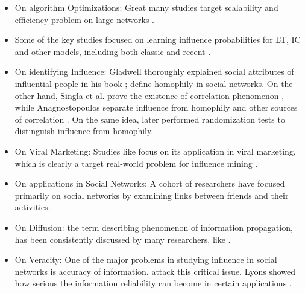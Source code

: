 	\begin{itemize}
		\item On algorithm Optimizations: Great many studies target scalability and efficiency problem on large networks \cite{chen2009,tang2009,chen2010b,goyal2011b,goyal2012,chen2012,jung2012}.
		
		\item Some of the key studies focused on learning influence probabilities for LT, IC and other models, including both classic \cite{granovetter1978} and recent \cite{saito2008,goyal2010}.
		
		\item On identifying Influence: Gladwell thoroughly explained social attributes of influential people in his book \cite{gladwell2006}; \cite{mcpherson2001} define homophily in social networks. On the other hand, Singla et al. prove the existence of correlation phenomenon \cite{singla2008}, while Anagnostopoulos separate influence from homophily and other sources of correlation \cite{anagnostopoulos2008}. On the same idea, \cite{aral2009,lafond2010} later performed randomization tests to distinguish influence from homophily.
		
		\item On Viral Marketing: Studies like \cite{mahajan1990,domingos2001,goldenberg2001,richardson2002,domingos2005,hill2006,leskovec2007,watts2007b,wortman2008,hu2014,barbieri2014} focus on its application in viral marketing, which is clearly a target real-world problem for influence mining \cite{jurvetson2000}.
		
		\item On applications in Social Networks: A cohort of researchers have focused primarily on social networks \cite{borodin2010,ienco2010,bakshy2011,li2013} by examining links between friends and their activities.
		
		\item On Diffusion: the term describing phenomenon of information propagation, has been consistently discussed by many researchers, like \cite{gruhl2004,song2006,song2007,watts2007,anagnostopoulos2008,crandall2008,cha2009,xiang2010,rodriguez2010,rodriguez2011,romero2011,myers2012,li2013,cheng2014,farajtabar2015}.
		
		\item On Veracity: One of the major problems in studying influence in social networks is accuracy of information. \cite{goldenberg2001,guha2004,ziegler2005,golbeck2006,taherian2008,castillo2011,chen2011,holthoefer2012,morone2015,farajtabar2015} attack this critical issue. Lyons showed how serious the information reliability can become in certain applications \cite{lyons2011}.
		

\end{itemize}
